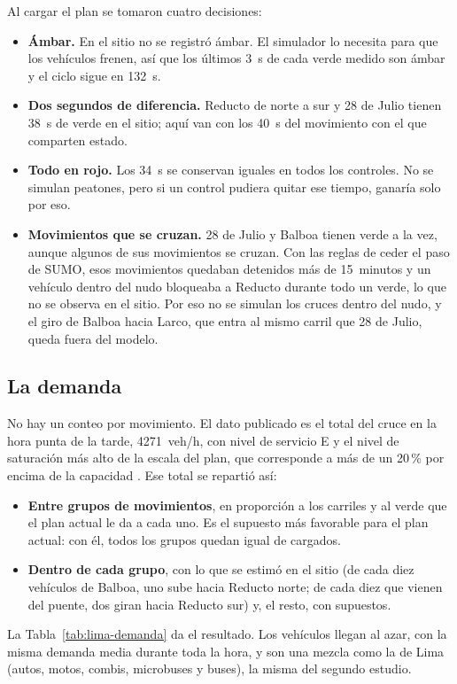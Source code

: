 Al cargar el plan se tomaron cuatro decisiones:
\begin{itemize}
  \item \textbf{Ámbar.} En el sitio no se registró ámbar. El simulador
    lo necesita para que los vehículos frenen, así que los últimos 3~s
    de cada verde medido son ámbar y el ciclo sigue en 132~s.
  \item \textbf{Dos segundos de diferencia.} Reducto de norte a sur y
    28 de Julio tienen 38~s de verde en el sitio; aquí van con los 40~s
    del movimiento con el que comparten estado.
  \item \textbf{Todo en rojo.} Los 34~s se conservan iguales en todos
    los controles. No se simulan peatones, pero si un control pudiera
    quitar ese tiempo, ganaría solo por eso.
  \item \textbf{Movimientos que se cruzan.} 28 de Julio y Balboa tienen
    verde a la vez, aunque algunos de sus movimientos se cruzan. Con las
    reglas de ceder el paso de SUMO, esos movimientos quedaban detenidos
    más de 15~minutos y un vehículo dentro del nudo bloqueaba a Reducto
    durante todo un verde, lo que no se observa en el sitio. Por eso no
    se simulan los cruces dentro del nudo, y el giro de Balboa hacia
    Larco, que entra al mismo carril que 28 de Julio, queda fuera del
    modelo.
\end{itemize}

\subsection*{La demanda}

No hay un conteo por movimiento. El dato publicado es el total del
cruce en la hora punta de la tarde, 4271~veh/h, con nivel de servicio E
y el nivel de saturación más alto de la escala del plan, que
corresponde a más de un 20\,\% por encima de la capacidad
\citep{Miraflores2017_PMU}. Ese total se repartió así:
\begin{itemize}
  \item \textbf{Entre grupos de movimientos}, en proporción a los
    carriles y al verde que el plan actual le da a cada uno. Es el
    supuesto más favorable para el plan actual: con él, todos los
    grupos quedan igual de cargados.
  \item \textbf{Dentro de cada grupo}, con lo que se estimó en el sitio
    (de cada diez vehículos de Balboa, uno sube hacia Reducto norte; de
    cada diez que vienen del puente, dos giran hacia Reducto sur) y, el
    resto, con supuestos.
\end{itemize}
La Tabla~\ref{tab:lima-demanda} da el resultado. Los vehículos llegan al
azar, con la misma demanda media durante toda la hora, y son una mezcla
como la de Lima (autos, motos, combis, microbuses y buses), la misma del
segundo estudio.

